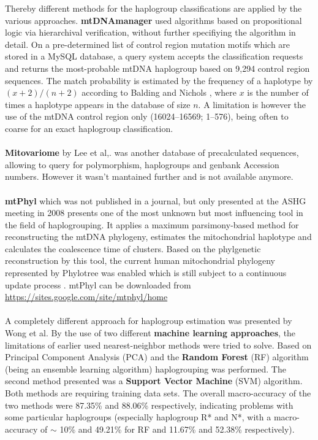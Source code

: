Thereby different methods for the haplogroup classifications are applied by the various approaches. \textbf{mtDNAmanager} used algorithms based on propositional logic via hierarchival verification, without further specifiying the algorithm in detail. On a pre-determined list of control region mutation motifs which are stored in a MySQL database, a query system accepts the classification requests and returns the most-probable mtDNA haplogroup based on 9,294 control region sequences. The match probability is estimated by the frequency of a haplotype by $(x+2)/(n+2)$ according to Balding and Nichols \cite{Balding1994}, where $x$ is the number of times a haplotype appears in the database of size $n$. A limitation is however the use of the mtDNA control region only (16024–16569; 1–576), being often to coarse for an exact haplogroup classification.\\
\\
\textbf{Mitovariome} by Lee et al,. \cite{Lee2009} was another database of precalculated sequences, allowing to query for polymorphism, haplogroups and genbank Accession numbers. However it wasn't mantained further and is not available anymore.\\
\\
\textbf{mtPhyl}\label{mtphyl} which was not published in a journal, but only presented at the ASHG meeting in 2008 presents one of the most unknown but most influencing tool in the field of haplogrouping. It applies a maximum parsimony-based method for reconstructing the mtDNA phylogeny, estimates the mitochondrial haplotype and calculates the coalescence time of clusters. Based on the phylgenetic reconstruction by this tool, the current human mitochondrial phylogeny represented by Phylotree was enabled which is still subject to a continuous update process \cite{VanOven2015}. mtPhyl can be downloaded from \url{https://sites.google.com/site/mtphyl/home}\\ 
\\
A completely different approach for haplogroup estimation was presented by Wong et al. \cite{Wong2011} By the use of two different \textbf{machine learning approaches}, the limitations of earlier used nearest-neighbor methods were tried to solve. Based on Principal Component Analysis (PCA) and the\textbf{ Random Forest} (RF) algorithm (being an ensemble learning algorithm) haplogrouping was performed. The second method presented was a \textbf{Support Vector Machine} (SVM) algorithm. Both methods are requiring training data sets. The overall macro-accuracy of the two methods were 87.35\% and 88.06\% respectively, indicating problems with some particular haplogroups (especially haplogroup R* and N*, with a macro-accuracy of $\sim$ 10\% and 49.21\% for RF and 11.67\% and 52.38\% respectively). \\
